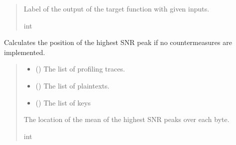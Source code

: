 \documentclass[letterpaper,10pt,english]{sphinxmanual}
\begin{document}
\begin{fulllineitems}
\begin{fulllineitems}
\begin{quote}
\begin{description}
\begin{itemize}
\end{itemize}

\sphinxAtStartPar
Label of the output of the target function with given inputs.

\sphinxAtStartPar
int

\end{description}\end{quote}

\end{fulllineitems}


\begin{fulllineitems}
\label{\detokenize{MLSCAlib.Ciphers:MLSCAlib.Ciphers.AES_leakage.AESLeakageModel.get_snr_poi}}
\pysigstartsignatures
{}
\pysigstopsignatures
\sphinxAtStartPar
Calculates the position of the highest SNR peak if no countermeasures are implemented.
\begin{quote}\begin{description}
\begin{itemize}
\item {} 
\sphinxAtStartPar
{} () \textendash{} The list of profiling traces.

\item {} 
\sphinxAtStartPar
{} () \textendash{} The list of plaintexts.

\item {} 
\sphinxAtStartPar
{} () \textendash{} The list of keys

\end{itemize}

\sphinxAtStartPar
The location of the mean of the highest SNR peaks over each byte.

\sphinxAtStartPar
int

\end{description}\end{quote}


\end{fulllineitems}
\end{fulllineitems}
\end{document}
